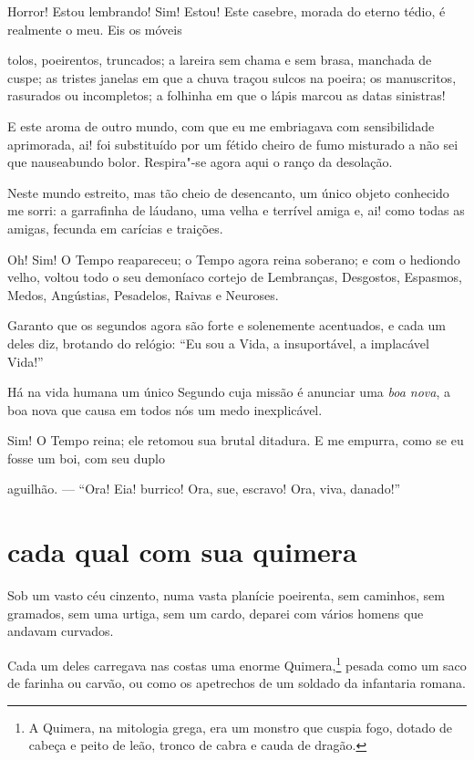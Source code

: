 Horror! Estou lembrando! Sim! Estou! Este casebre, morada do eterno
tédio, é realmente o meu. Eis os móveis

\noindent{}tolos, poeirentos, truncados; a
lareira sem chama e sem brasa, manchada de cuspe; as tristes janelas em
que a chuva traçou sulcos na poeira; os manuscritos, rasurados ou
incompletos; a folhinha em que o lápis marcou as datas sinistras!

E este aroma de outro mundo, com que eu me embriagava com
sensibilidade aprimorada, ai! foi substituído por um fétido cheiro
de fumo misturado a não sei que nauseabundo bolor. Respira"-se agora
aqui o ranço da desolação.

Neste mundo estreito, mas tão cheio de desencanto, um único objeto conhecido
me sorri: a garrafinha de láudano, uma velha e terrível amiga e, ai!
como todas as amigas, fecunda em carícias e traições.

Oh! Sim! O Tempo reapareceu; o Tempo agora reina soberano; e com o
hediondo velho, voltou todo o seu demoníaco cortejo de Lembranças,
Desgostos, Espasmos, Medos, Angústias, Pesadelos, Raivas e Neuroses.

Garanto que os segundos agora são forte e solenemente acentuados, e
cada um deles diz, brotando do relógio: ``Eu sou a Vida, a
insuportável, a implacável Vida!''

Há na vida humana um único Segundo cuja missão é anunciar uma \textit{boa
nova}, a boa nova que causa em todos nós um medo inexplicável.

Sim! O Tempo reina; ele retomou sua brutal ditadura. E me empurra, como
se eu fosse um boi, com seu duplo

\quebra

\noindent{}aguilhão. --- ``Ora!
Eia! burrico! Ora, sue, escravo! Ora, viva, danado!''

\quebra\section[Cada qual com sua quimera]{cada qual com sua quimera}

Sob um vasto céu cinzento, numa vasta planície poeirenta, sem
caminhos, sem gramados, sem uma urtiga, sem um cardo, deparei com vários
homens que andavam curvados.

Cada um deles carregava nas costas uma enorme
Quimera,\protect\footnote{  A Quimera, na mitologia grega, era um monstro que cuspia fogo, dotado
de cabeça e peito de leão, tronco de cabra e cauda de dragão.} pesada como um saco de farinha ou
carvão, ou como os apetrechos de um soldado da infantaria romana.

